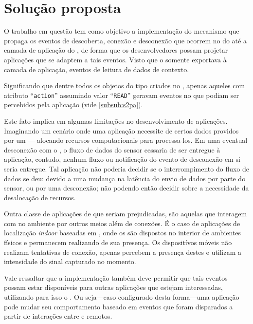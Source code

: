 \chapter{Solução proposta}\label{chap:solucao}

O trabalho em questão tem como objetivo a implementação do mecanismo que propaga os eventos de descoberta, conexão e desconexão que ocorrem no \stwopa do \mhub até a camada de aplicação do \cddl, de forma que os desenvolvedores possam projetar aplicações que se adaptem a tais eventos.
Visto que o \cddl somente exportava à camada de aplicação, eventos de leitura de dados de contexto.

Significando que dentre todos os objetos do tipo \sensordata criados no \stwopa, apenas aqueles com atributo ``\texttt{action}'' assumindo valor ``\texttt{READ}'' geravam eventos no \cddl que podiam ser percebidos pela aplicação (vide \autoref{subsub:s2pa}).

Este fato implica em algumas limitações no desenvolvimento de aplicações.
Imaginando um cenário onde uma aplicação necessite de certos dados providos por um \smartobj--- alocando recursos computacionais para processa-los.
Em uma eventual desconexão com o \smartobj, o fluxo de dados do sensor cessaria de ser entregue à aplicação, contudo, nenhum fluxo ou notificação do evento de desconexão em si seria entregue.
Tal aplicação não poderia decidir se o interrompimento do fluxo de dados se deu: devido a uma mudança na latência do envio de dados por parte do sensor, ou por uma desconexão; não podendo então decidir sobre a necessidade da desalocação de recursos.

Outra classe de aplicações de \iomt que seriam prejudicadas, são aquelas que interagem com \smartobjs no ambiente por outros meios além de conexões.
É o caso de aplicações de localização \textit{indoor} baseadas em \beacons \bluetooth, onde os \beacons são dispostos no interior de ambientes físicos e permanecem realizando \broadcast de sua presença.
Os dispositívos móveis não realizam tentativas de conexão, apenas percebem a presença destes \smartobjs e utilizam a intensidade do sinal capturado no momento.

Vale ressaltar que a implementação também deve permitir que tais eventos possam estar disponíveis para outras aplicações que estejam interessadas, utilizando para isso o \mqtt.
Ou seja---caso configurado desta forma---uma aplicação \mhubcddl pode mudar seu comportamento baseado em eventos que foram disparados a partir de interações entre \smartobjs e \smartphones remotos.

